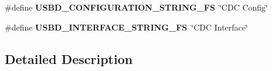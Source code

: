 \begin{DoxyCompactItemize}
\item 
\hypertarget{group___u_s_b_d___d_e_s_c___private___defines_gaca5e66e8b6c89a896f6ad16f9a68128f}{}\label{group___u_s_b_d___d_e_s_c___private___defines_gaca5e66e8b6c89a896f6ad16f9a68128f} 
\#define {\bfseries U\+S\+B\+D\+\_\+\+C\+O\+N\+F\+I\+G\+U\+R\+A\+T\+I\+O\+N\+\_\+\+S\+T\+R\+I\+N\+G\+\_\+\+FS}~\char`\"{}C\+DC Config\char`\"{}
\item 
\hypertarget{group___u_s_b_d___d_e_s_c___private___defines_ga2562ccc9162020b79f07d813eba10ddb}{}\label{group___u_s_b_d___d_e_s_c___private___defines_ga2562ccc9162020b79f07d813eba10ddb} 
\#define {\bfseries U\+S\+B\+D\+\_\+\+I\+N\+T\+E\+R\+F\+A\+C\+E\+\_\+\+S\+T\+R\+I\+N\+G\+\_\+\+FS}~\char`\"{}C\+DC Interface\char`\"{}
\end{DoxyCompactItemize}


\subsection{Detailed Description}
